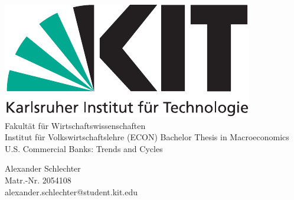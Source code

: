 \documentclass[12pt, a4paper]{article} %
\begin{document}

\begin{titlepage}
\begin{center}
\includegraphics[scale=0.65]{KITlogo}\\
\large
Fakultät für Wirtschaftswissenschaften\\
Institut für Volkswirtschaftslehre (ECON)
\vfill{
\Large
Bachelor Thesis in Macroeconomics\\\vspace{0.5cm}
}
\vfill{
\LARGE
U.S. Commercial Banks: Trends and Cycles
\\ 
\vspace{0.5cm}
\normalsize
}
\end{center}

\vfill{
\normalsize
\noindent Alexander Schlechter \\
Matr.-Nr. 2054108 \\
alexander.schlechter@student.kit.edu}
\end{titlepage}
\newpage


\tableofcontents
\newpage
{}


\iffalse
\end{document}
